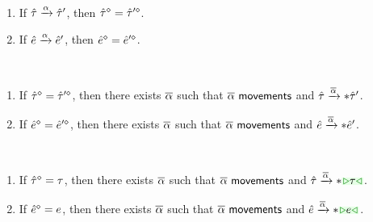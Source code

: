 \documentclass{article}
\begin{document}
%
\begin{mathpar}

\end{mathpar}

\judgbox{\ensuremath{\movements{\AIMV}}}
%
\begin{mathpar}

\end{mathpar}

\begin{theorem}[name=Sensibility]
\end{theorem}

\begin{theorem}[name=Movement Erasure Invariance] \
  \begin{enumerate}
    \item If $\ATAction{\ZTMV}{\ZTMV'}{\AMV}$, then $\cursorErase{\ZTMV} = \cursorErase{\ZTMV'}$.
    \item If $\AEAction{\ZMV}{\ZMV'}{\AMV}$, then $\cursorErase{\ZMV} = \cursorErase{\ZMV'}$.
  \end{enumerate}
\end{theorem}

\begin{theorem}[name=Reachability] \
  \begin{enumerate}
    \item If $\cursorErase{\ZTMV} = \cursorErase{\ZTMV'}$, then there exists $\AIMV$ such that
      $\movements{\AIMV}$ and $\ATActionIter{\ZTMV}{\ZTMV'}{\AIMV}$.

    \item If $\cursorErase{\ZMV} = \cursorErase{\ZMV'}$, then there exists $\AIMV$ such that
      $\movements{\AIMV}$ and $\AEActionIter{\ZMV}{\ZMV'}{\AIMV}$.
  \end{enumerate}
\end{theorem}

\begin{lemma}[name=Reach Up] \
  \begin{enumerate}
    \item If $\cursorErase{\ZTMV} = \TMV$, then there exists $\AIMV$ such that $\movements{\AIMV}$
      and $\ATActionIter{\ZTMV}{\ZTCursor{\TMV}}{\AIMV}$.

    \item If $\cursorErase{\ZMV} = \EMV$, then there exists $\AIMV$ such that $\movements{\AIMV}$
      and $\AEActionIter{\ZMV}{\ZTCursor{\EMV}}{\AIMV}$.
  \end{enumerate}
\end{lemma}
\end{document}
